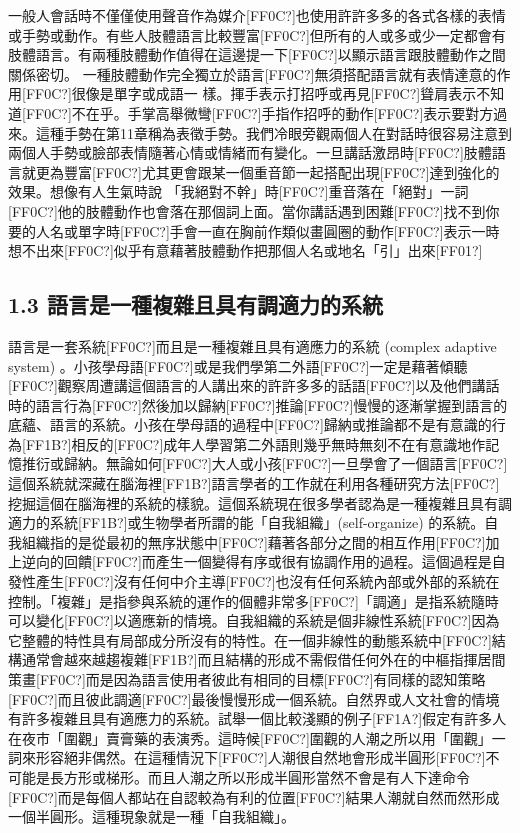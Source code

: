 一般人會話時不僅僅使用聲音作為媒介[FF0C?]也使用許許多多的各式各樣的表情或手勢或動作。有些人肢體語言比較豐富[FF0C?]但所有的人或多或少一定都會有肢體語言。有兩種肢體動作值得在這邊提一下[FF0C?]以顯示語言跟肢體動作之間關係密切。 一種肢體動作完全獨立於語言[FF0C?]無須搭配語言就有表情達意的作用[FF0C?]很像是單字或成語一 樣。揮手表示打招呼或再見[FF0C?]聳肩表示不知道[FF0C?]不在乎。手掌高舉微彎[FF0C?]手指作招呼的動作[FF0C?]表示要對方過來。這種手勢在第11章稱為表徵手勢。我們冷眼旁觀兩個人在對話時很容易注意到兩個人手勢或臉部表情隨著心情或情緒而有變化。一旦講話激昂時[FF0C?]肢體語言就更為豐富[FF0C?]尤其更會跟某一個重音節一起搭配出現[FF0C?]達到強化的效果。想像有人生氣時說 「我絕對不幹」時[FF0C?]重音落在「絕對」一詞[FF0C?]他的肢體動作也會落在那個詞上面。當你講話遇到困難[FF0C?]找不到你要的人名或單字時[FF0C?]手會一直在胸前作類似畫圓圈的動作[FF0C?]表示一時想不出來[FF0C?]似乎有意藉著肢體動作把那個人名或地名「引」出來[FF01?]

\subsection{1.3 語言是一種複雜且具有調適力的系統}

語言是一套系統[FF0C?]而且是一種複雜且具有適應力的系統 (complex adaptive system) \citep{BecknerEtAl2009}。小孩學母語[FF0C?]或是我們學第二外語[FF0C?]一定是藉著傾聽[FF0C?]觀察周遭講這個語言的人講出來的許許多多的話語[FF0C?]以及他們講話時的語言行為[FF0C?]然後加以歸納[FF0C?]推論[FF0C?]慢慢的逐漸掌握到語言的底蘊、語言的系統。小孩在學母語的過程中[FF0C?]歸納或推論都不是有意識的行為[FF1B?]相反的[FF0C?]成年人學習第二外語則幾乎無時無刻不在有意識地作記憶推衍或歸納。無論如何[FF0C?]大人或小孩[FF0C?]一旦學會了一個語言[FF0C?]這個系統就深藏在腦海裡[FF1B?]語言學者的工作就在利用各種研究方法[FF0C?]挖掘這個在腦海裡的系統的樣貌。這個系統現在很多學者認為是一種複雜且具有調適力的系統[FF1B?]或生物學者所謂的能「自我組織」(self-organize) 的系統。自我組織指的是從最初的無序狀態中[FF0C?]藉著各部分之間的相互作用[FF0C?]加上逆向的回饋[FF0C?]而產生一個變得有序或很有協調作用的過程。這個過程是自發性產生[FF0C?]沒有任何中介主導[FF0C?]也沒有任何系統內部或外部的系統在控制。「複雜」是指參與系統的運作的個體非常多[FF0C?]「調適」是指系統隨時可以變化[FF0C?]以適應新的情境。自我組織的系統是個非線性系統[FF0C?]因為它整體的特性具有局部成分所沒有的特性。在一個非線性的動態系統中[FF0C?]結構通常會越來越趨複雜[FF1B?]而且結構的形成不需假借任何外在的中樞指揮居間策畫[FF0C?]而是因為語言使用者彼此有相同的目標[FF0C?]有同樣的認知策略[FF0C?]而且彼此調適[FF0C?]最後慢慢形成一個系統。自然界或人文社會的情境有許多複雜且具有適應力的系統。試舉一個比較淺顯的例子[FF1A?]假定有許多人在夜市「圍觀」賣膏藥的表演秀。這時候[FF0C?]圍觀的人潮之所以用「圍觀」一詞來形容絕非偶然。在這種情況下[FF0C?]人潮很自然地會形成半圓形[FF0C?]不可能是長方形或梯形。而且人潮之所以形成半圓形當然不會是有人下達命令[FF0C?]而是每個人都站在自認較為有利的位置[FF0C?]結果人潮就自然而然形成一個半圓形。這種現象就是一種「自我組織」。

